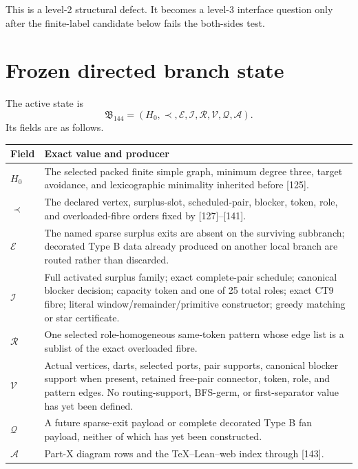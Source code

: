 \documentclass[11pt]{article}
\begin{document}
This is a level-2 structural defect.  It becomes a level-3 interface question
only after the finite-label candidate below fails the both-sides test.

\section{Frozen directed branch state}

The active state is
\[
 \mathfrak B_{144}=(H_0,\prec,\mathcal E,\mathcal I,
                    \mathcal R,\mathcal V,\mathcal Q,\mathcal A).
\]
Its fields are as follows.

\begin{longtable}{>{\raggedright\arraybackslash}p{}
                  >{\raggedright\arraybackslash}p{}}
\toprule
Field & Exact value and producer \\
\midrule
$H_0$ & The selected packed finite simple graph, minimum degree three,
target avoidance, and lexicographic minimality inherited before [125]. \\
$\prec$ & The declared vertex, surplus-slot, scheduled-pair, blocker, token,
role, and overloaded-fibre orders fixed by [127]--[141]. \\
$\mathcal E$ & The named sparse surplus exits are absent on the surviving
subbranch; decorated Type B data already produced on another local branch are
routed rather than discarded. \\
$\mathcal I$ & Full activated surplus family; exact complete-pair schedule;
canonical blocker decision; capacity token and one of 25 total roles; exact
CT9 fibre; literal window/remainder/primitive constructor; greedy matching or
star certificate. \\
$\mathcal R$ & One selected role-homogeneous same-token pattern whose edge
list is a sublist of the exact overloaded fibre. \\
$\mathcal V$ & Actual vertices, darts, selected ports, pair supports,
canonical blocker support when present, retained free-pair connector, token,
role, and pattern edges.  No routing-support, BFS-germ, or first-separator
value has yet been defined. \\
$\mathcal Q$ & A future sparse-exit payload or complete decorated Type B fan
payload, neither of which has yet been constructed. \\
$\mathcal A$ & Part-X diagram rows and the TeX--Lean--web index through
[143]. \\
\bottomrule
\end{longtable}
\end{document}
